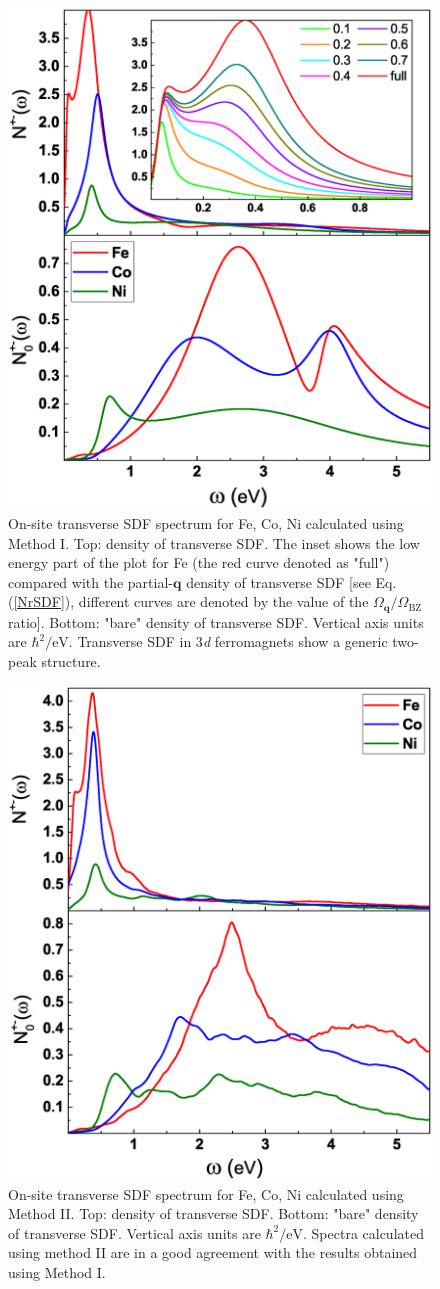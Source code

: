 \begin{figure}[h!]
\centering
\includegraphics[width=0.5\hsize]{Chapters/TDDFT/figures/Article/Npm.eps}
\caption{On-site transverse SDF spectrum for Fe, Co, Ni calculated using Method I. Top: density of transverse SDF. The inset shows the low energy part of the plot for Fe (the red curve denoted as "full") compared with the partial-$\mathbf{q}$ density of transverse SDF [see Eq. (\ref{NrSDF}), different curves are denoted by the value of the $\Omega_{\mathbf{q}}/\Omega_{\text{BZ}}$ ratio]. Bottom: "bare" density of transverse SDF. Vertical axis units are $\hbar^2/\text{eV}$. Transverse SDF in 3\emph{d} ferromagnets show a generic two-peak structure.}
\label{Npm}
\end{figure} 

\begin{figure}[h!]
\centering
\includegraphics[width=0.5\hsize]{Chapters/TDDFT/figures/Article/NpmElk.eps}
\caption{On-site transverse SDF spectrum for Fe, Co, Ni calculated using Method II. Top: density of transverse SDF. Bottom: "bare" density of transverse SDF. Vertical axis units are $\hbar^2/\text{eV}$. Spectra calculated using method II are in a good agreement with the results obtained using Method I.}
\label{NpmElk}
\end{figure} 




